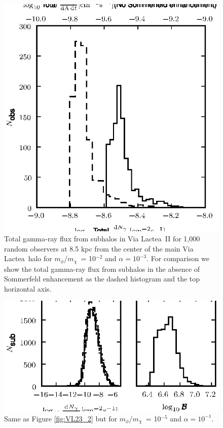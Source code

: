 \documentclass[aps,prd,twocolumn,amsmath,amssymb,floatfix,nofootinbib,10pt]{revtex4}
\newcommand{\VL}{Via Lactea}
\newcommand{\mdm}{\ensuremath{m_{\chi}}}
\newcommand{\mv}{\ensuremath{m_{\phi}}}
\begin{document}
\begin{figure}
\centering
\includegraphics{hist_-2_-3_10_3.eps}
\caption{Total gamma-ray flux from subhalos in \VL\ II for 1,000
random observers at 8.5 kpc from the center of the main \VL\ halo for
\mv/\mdm\ = 10$^{-2}$ and $\alpha = 10^{-3}$. For comparison we show
the total gamma-ray flux from subhalos in the absence of Sommerfeld
enhancement as the dashed histogram and the top horizontal axis.}%
\label{fig:VL23_3}%
\end{figure}



\begin{figure}
\centering
\includegraphics{hist_-5_-1_10_2.eps}
\caption{Same as Figure \ref{fig:VL23_2} but for \mv/\mdm\ = 10$^{-5}$
and $\alpha = 10^{-1}$.}%
\label{fig:VL51_1}%
\end{figure}
\end{document}

